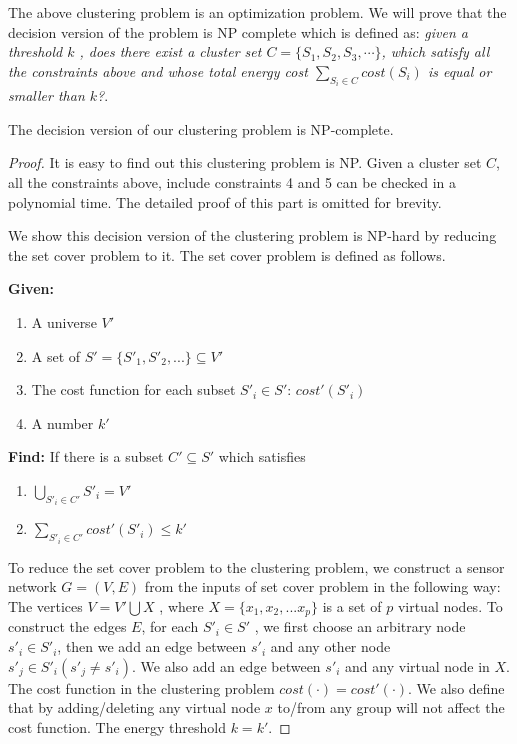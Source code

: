 The above clustering problem is an optimization problem. We will prove that the decision version of the problem is NP complete which is defined as: \emph{given a threshold \(k\) , does there exist a cluster set \(C=\{S_1, S_2, S_3, \cdots\}\), which satisfy all the constraints above and whose total energy cost \(\sum\limits_{S_i \in C} cost(S_i)\) is equal or smaller than \(k\)?}.

\begin{theorem}
The decision version of our clustering problem is NP-complete.
\end{theorem}

\begin{proof}
It is easy to find out this clustering problem is NP.  Given a cluster set \(C\), all the constraints above, include constraints 4 and 5 can be checked in a polynomial time. The detailed proof of this part is omitted for brevity.

We show this decision version of the clustering problem is NP-hard by reducing the set cover problem to it. The set cover problem is defined as follows.

\begin{flushleft}
\textbf{Given:}
\end{flushleft}
\begin{enumerate}
\item A universe \(V'\)
\item A set of \(S'=\{S'_1, S'_2, ...\}\subseteq V'\)
\item The cost function for each subset \(S'_i\in S'\): \(cost'(S'_i)\) 
\item A number \(k'\)
\end{enumerate}
\textbf{Find: }
If there is a subset \(C'\subseteq S'\) which satisfies
\begin{enumerate}
\item \( \bigcup\limits_{S'_i \in C'} S'_i =V'\)
\item \( \sum\limits_{S'_i \in C'} cost'(S'_i) \leq k'\)
\end{enumerate}

To reduce the set cover problem to the clustering problem, we construct a sensor network \(G=(V, E)\) from the inputs of set cover problem in the following way:
The vertices \(V =V'\bigcup X\) , where \(X = \{x_1,x_2,...x_p\}\)  is a set of \(p\) virtual nodes. 
To construct the edges \(E\), for each \(S'_i\in S'\) , we first choose an arbitrary  node \(s'_i\in S'_i\), then we add an edge between \(s'_i\) and any other node \(s'_j \in S'_i (s'_j\neq s'_i)\). We also add an edge between \(s'_i\) and any virtual node in \(X\). 
The cost function in the clustering problem \(cost(\cdot) = cost'(\cdot)\). We also define that by adding/deleting any virtual node \(x\) to/from any group will not affect the cost function. The energy threshold \(k=k'\). 


\end{proof}
